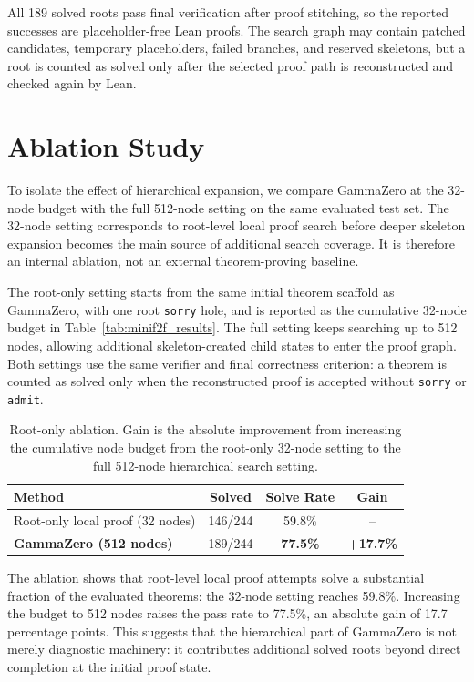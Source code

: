 All 189 solved roots pass final verification after proof stitching, so the reported
successes are placeholder-free Lean proofs. The search graph may contain patched candidates, temporary
placeholders, failed branches, and reserved skeletons, but a root is counted as solved only after the
selected proof path is reconstructed and checked again by Lean.

\section{Ablation Study}

To isolate the effect of hierarchical expansion, we compare GammaZero at the 32-node budget with the
full 512-node setting on the same evaluated test set. The 32-node setting corresponds to root-level
local proof search before deeper skeleton expansion becomes the main source of additional search
coverage. It is therefore an internal ablation, not an external theorem-proving baseline.

The root-only setting starts from the same initial theorem scaffold as GammaZero, with one root
\texttt{sorry} hole, and is reported as the cumulative 32-node budget in Table~\ref{tab:minif2f_results}.
The full setting keeps searching up to 512 nodes, allowing additional skeleton-created child states to
enter the proof graph. Both settings use the same verifier and final correctness criterion: a theorem is
counted as solved only when the reconstructed proof is accepted without \texttt{sorry} or \texttt{admit}.

\begin{table}[h]
\centering
\small
\begin{tabular}{@{}lccc@{}}
\toprule
Method & Solved & Solve Rate & Gain \\
\midrule
Root-only local proof (32 nodes) & 146/244 & 59.8\% & -- \\
\textbf{GammaZero (512 nodes)} & 189/244 & \textbf{77.5\%} & \textbf{+17.7\%} \\
\bottomrule
\end{tabular}
\caption{Root-only ablation. Gain is the absolute improvement from increasing the cumulative node budget from the root-only 32-node setting to the full 512-node hierarchical search setting.}
\label{tab:root-only-ablation}
\end{table}

The ablation shows that root-level local proof attempts solve a substantial fraction of the evaluated
theorems: the 32-node setting reaches 59.8\%. Increasing the budget to 512 nodes raises the pass rate
to 77.5\%, an absolute gain of 17.7 percentage points. This suggests that the hierarchical part of
GammaZero is not merely diagnostic machinery: it contributes additional solved roots beyond direct
completion at the initial proof state.

